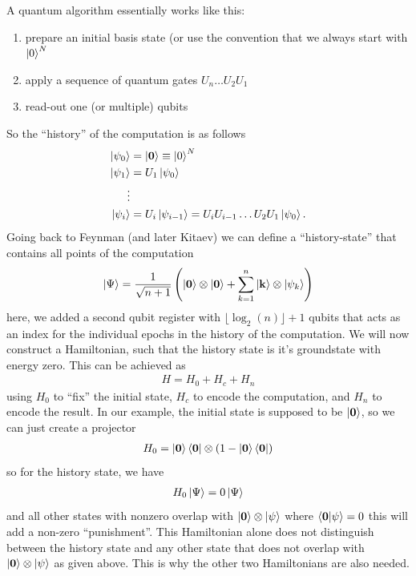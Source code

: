 A quantum algorithm essentially works like this:
\begin{enumerate}
    \item prepare an initial basis state (or use the convention that we always start with $\ket{0}^N$
    \item apply a sequence of quantum gates $U_n\dots U_2U_1$
    \item read-out one (or multiple) qubits
\end{enumerate}
So the ``history'' of the computation is as follows
\begin{align}
    \ket{\psi_0} &= \ket{\mathbf{0}} \equiv \ket{0}^N\\
    \ket{\psi_1} &= U_1\ket{\psi_0}\\
    \vdots &\\
    \ket{\psi_i} &= U_i \ket{\psi_{i-1}} = U_i U_{i-1}\dots U_2U_1\ket{\psi_0}.
\end{align}
Going back to Feynman (and later Kitaev) we can define a ``history-state'' that contains all points of the computation
\begin{align}
    \ket{\Psi} = \frac{1}{\sqrt{n+1}}\left( \ket{\mathbf{0}}\otimes \ket{\mathbf{0}} + \sum_{k=1}^n \ket{\mathbf{k}} \otimes \ket{\psi_k} \right)
\end{align}
here, we added a second qubit register with $\lfloor \log_2(n)\rfloor + 1$ qubits that acts as an index for the individual epochs in the history of the computation.
We will now construct a Hamiltonian, such that the history state is it's groundstate with energy zero. This can be achieved as
\begin{align}
    H = H_0 + H_c +  H_n
\end{align}
using $H_0$ to ``fix'' the initial state, $H_c$ to encode the computation, and $H_n$ to encode the result. 
In our example, the initial state is supposed to be $\ket{\mathbf{0}}$, so we can just create a projector
\begin{align}
    H_0 = \ket{\mathbf{0}}\bra{\mathbf{0}} \otimes \left(1-\ket{\mathbf{0}}\bra{\mathbf{0}}\right)
\end{align}
so for the history state, we have
\begin{align}
    H_0 \ket{\Psi} = 0 \ket{\Psi}
\end{align}
and all other states with nonzero overlap with $\ket{\mathbf{0}}\otimes \ket{\psi}$ where $\braket{\mathbf{0}}{\psi}=0$ this will add a non-zero ``punishment''. This Hamiltonian alone does not distinguish between the history state and any other state that does not overlap with $\ket{\mathbf{0}}\otimes \ket{\psi}$ as given above. This is why the other two Hamiltonians are also needed. 
